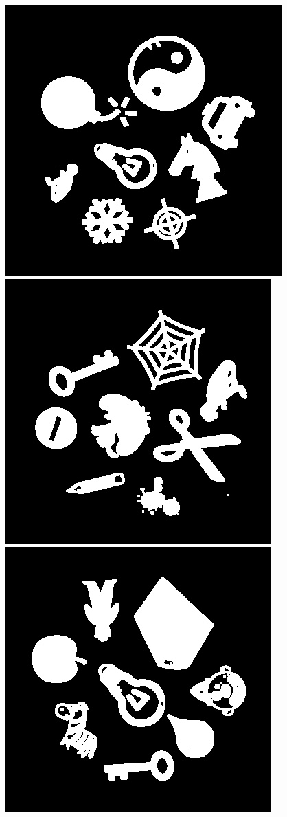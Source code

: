 \documentclass[10pt,a4paper]{article}
\begin{document}
\begin{center}
\includegraphics[scale=0.25]{2.1/3.jpg}
\includegraphics[scale=0.25]{2.1/4.jpg}
\includegraphics[scale=0.25]{2.1/5.jpg}
\end{center}
\end{document}
